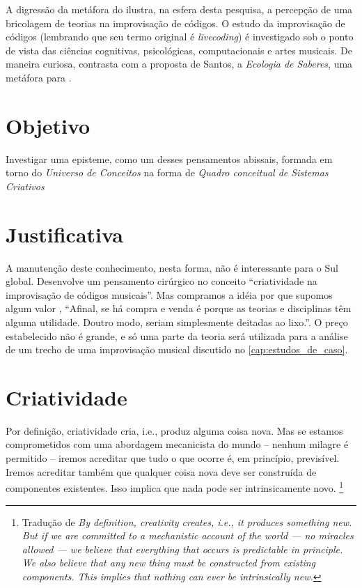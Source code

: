 A digressão da metáfora do  ilustra, na esfera desta pesquisa, a percepção de uma bricolagem de teorias na improvisação de códigos. O estudo da improvisação de códigos (lembrando que seu termo original é \emph{livecoding}) é investigado sob o ponto de vista das ciências cognitivas, psicológicas, computacionais e artes musicais. De maneira curiosa, contrasta com a proposta de Santos, a \emph{Ecologia de Saberes}, uma metáfora para .

\section{Objetivo}

Investigar uma episteme, como um desses pensamentos abissais, formada em torno do \emph{Universo de Conceitos} na forma de \emph{Quadro conceitual de Sistemas Criativos}  

\section{Justificativa}

 A manutenção deste conhecimento, nesta forma, não é interessante para o Sul global. Desenvolve um pensamento cirúrgico no conceito ``criatividade na improvisação de códigos musicais''. Mas compramos a idéia por que supomos algum valor \cite[p.~20]{santos_filosofia_2008}, ``Afinal, se há compra e venda é porque as teorias e disciplinas têm alguma utilidade. Doutro modo, seriam simplesmente deitadas ao lixo.''. O preço estabelecido não é grande, e só uma parte da teoria será utilizada para a análise de um trecho de uma improvisação musical discutido no \autoref{cap:estudos_de_caso}.

\section{Criatividade}\label{sec:sistemas_criativos}

\begin{citacao}
Por definição, criatividade cria, i.e., produz alguma coisa nova. Mas se estamos comprometidos com uma abordagem mecanicista do mundo -- nenhum milagre é permitido -- iremos acreditar que tudo o que ocorre é, em princípio,  previsível. Iremos acreditar também que qualquer coisa nova deve ser construída de componentes existentes. Isso implica que nada pode ser intrinsicamente novo. \cite[p.~2]{thornton_quantitative_2007}\footnote{Tradução de \emph{By definition, creativity creates, i.e., it produces something new. But if we are committed to a mechanistic account of the world — no miracles allowed — we believe that everything that occurs is predictable in principle. We also believe that any new thing must be constructed from existing components. This implies that nothing can ever be intrinsically new.}}
\end{citacao}
 
